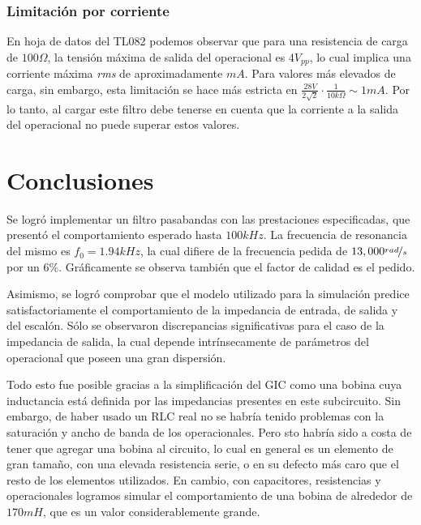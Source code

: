 \documentclass[../../tc_tp3_main.tex]{subfiles}
\begin{document}
\subsubsection{Limitaci\'on por corriente}

En hoja de datos del TL082 podemos observar que para una resistencia de carga de $100\Omega$, la tensi\'on m\'axima de salida del operacional es $4V_{pp}$, lo cual implica una corriente m\'axima \textit{rms} de aproximadamente $mA$. Para valores m\'as elevados de carga, sin embargo, esta limitaci\'on se hace m\'as estricta en $\frac{28V}{2\sqrt{2}} \cdot \frac{1}{10k\Omega} \sim 1mA$. Por lo tanto, al cargar este filtro debe tenerse en cuenta que la corriente a la salida del operacional no puede superar estos valores.


\section{Conclusiones}

Se logr\'o implementar un filtro pasabandas con las prestaciones especificadas, que present\'o el comportamiento esperado hasta $100kHz$. La frecuencia de resonancia del mismo es $f_0 = 1.94kHz$, la cual difiere de la frecuencia pedida de $13,000\nicefrac{rad}{s}$ por un $6\%$. Gr\'aficamente se observa tambi\'en que el factor de calidad es el pedido. \par
Asimismo, se logr\'o comprobar que el modelo utilizado para la simulaci\'on predice satisfactoriamente el comportamiento de la impedancia de entrada, de salida y del escal\'on. S\'olo se observaron discrepancias significativas para el caso de la impedancia de salida, la cual depende intr\'insecamente de par\'ametros del operacional que poseen una gran dispersi\'on. \par

Todo esto fue posible gracias a la simplificaci\'on del GIC como una bobina cuya inductancia est\'a definida por las impedancias presentes en este subcircuito. Sin embargo, de haber usado un RLC real no se habr\'ia tenido problemas con la saturaci\'on y ancho de banda de los operacionales. Pero sto habr\'ia sido a costa de tener que agregar una bobina al circuito, lo cual en general es un elemento de gran tama\~no, con una elevada resistencia serie, o en su defecto m\'as caro que el resto de los elementos utilizados. En cambio, con capacitores, resistencias y operacionales logramos simular el comportamiento de una bobina de alrededor de $170mH$, que es un valor considerablemente grande.
\end{document}
